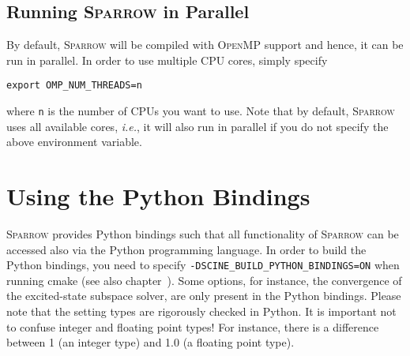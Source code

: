 \documentclass[]{tufte-book}
\begin{document}
\section{Running \textsc{Sparrow} in Parallel}

By default, \textsc{Sparrow} will be compiled with \textsc{OpenMP} support and hence, it can be run in parallel. In order
to use multiple CPU cores, simply specify
\begin{verbatim}
export OMP_NUM_THREADS=n
\end{verbatim}
where \texttt{n} is the number of CPUs you want to use. Note that by default, \textsc{Sparrow} uses all available cores,
\textit{i.e.}, it will also run in parallel if you do not specify the above environment variable.



\chapter{Using the Python Bindings}

\textsc{Sparrow} provides Python bindings such that all functionality of \textsc{Sparrow} can be accessed also via the
Python programming language. In order to build the Python bindings, you need to specify \texttt{-DSCINE\_BUILD\_PYTHON\_BINDINGS=ON}
when running cmake (see also chapter~). 
Some options, for instance, the convergence of the excited-state subspace solver, 
are only present in the Python bindings.
Please note that the setting types are rigorously checked in Python. It is
important not to confuse integer and floating point types!
For instance, there is a difference between 1 (an integer type) and 1.0 (a floating
point type).
\end{document}
